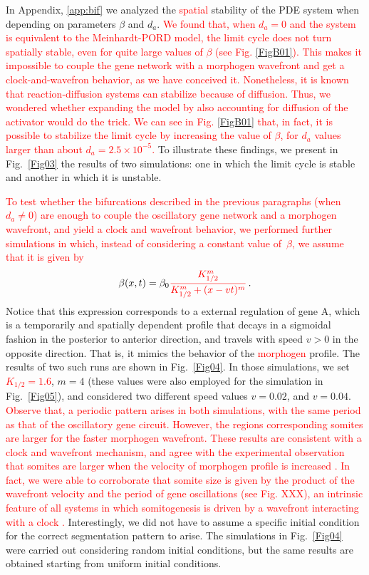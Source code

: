 \documentclass[%
 preprint,
 aip, 
 amsmath,amssymb,
]{revtex4-2}
\begin{document}
In Appendix, \ref{app:bif} we analyzed the \textcolor{red}{spatial} stability of the PDE system when depending on parameters $\beta$ and $d_a$. \textcolor{red}{We found that, when $d_a = 0$ and the system is equivalent to the Meinhardt-PORD model, the limit cycle does not turn spatially stable, even for quite large values of $\beta$ (see Fig. \ref{FigB01}). This makes it impossible to couple the gene network with a morphogen wavefront and get a clock-and-wavefron behavior, as we have conceived it. Nonetheless, it is known that reaction-diffusion systems can stabilize because of diffusion. Thus, we wondered whether expanding the model by also accounting for diffusion of the activator would do the trick. We can see in Fig. \ref{FigB01} that, in fact, it is possible to stabilize the limit cycle by increasing the value of $\beta$, for $d_a$ values larger than about $d_a=2.5\times10^{-5}$.} To illustrate these findings, we present in Fig.~\ref{Fig03} the results of two simulations: one in which the limit cycle is stable and another in which it is unstable. 

\textcolor{red}{To test whether the bifurcations described in the previous paragraphs (when $d_a \neq 0$) are enough to couple the oscillatory gene network and a morphogen wavefront, and yield a clock and wavefront behavior, we performed further simulations in which, instead of considering a constant value of~$\beta$, we assume that it is given by} 
	\begin{gather}\label{eqbeta}
	\beta(x, t) = \beta_0 \textcolor{red}{\frac{K_{1/2}^m}{K_{1/2}^m + (x - v t)^m}}\,.
	\end{gather}
Notice that this expression corresponds to a external regulation of gene A, which is a temporarily and spatially dependent profile that decays in a sigmoidal fashion in the posterior to anterior direction, and travels with speed $v>0$ in the opposite direction. That is, it mimics the behavior of the \textcolor{red}{morphogen} profile. The results of two such runs are shown in Fig.~\ref{Fig04}. In those simulations, we set \textcolor{red}{$K_{1/2} =1.6 $}, $m = 4 $ (these values were also employed for the simulation in Fig.~\ref{Fig05}), and considered two different speed values $v = 0.02 $, and $v = 0.04$. \textcolor{red}{Observe that, a periodic pattern arises in both simulations, with the same period as that of the oscillatory gene circuit. However, the regions corresponding somites are larger for the faster morphogen wavefront. These results are consistent with a clock and wavefront mechanism, and agree with the experimental observation that somites are larger when the velocity of \textcolor{red}{morphogen} profile is increased \cite{Sawada2001}. In fact, we were able to corroborate that somite size is given by the product of the wavefront velocity and the period of gene oscillations (see Fig. XXX), an intrinsic feature of all systems in which somitogenesis is driven by a wavefront interacting with a clock \cite{Morelli2009}.} Interestingly, we did not have to  assume a specific initial condition for the correct segmentation pattern to arise. The simulations in Fig.~\ref{Fig04} were carried out considering random initial conditions, but the same results are obtained starting from uniform initial conditions. 
\end{document}
